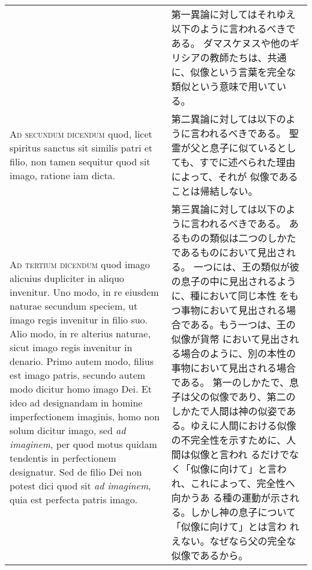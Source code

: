 \documentclass[10pt]{jsarticle} %
\begin{document}
\begin{longtable}{p{21em}p{21em}}
&

第一異論に対してはそれゆえ以下のように言われるべきである。
ダマスケヌスや他のギリシアの教師たちは、共通に、似像という言葉を完全な
 類似という意味で用いている。

\\



{\scshape Ad secundum dicendum} quod, licet spiritus sanctus sit similis patri et
filio, non tamen sequitur quod sit imago, ratione iam dicta.


&

第二異論に対しては以下のように言われるべきである。
聖霊が父と息子に似ているとしても、すでに述べられた理由によって、それが
 似像であることは帰結しない。

\\



{\scshape Ad tertium dicendum} quod imago alicuius dupliciter in aliquo
invenitur. Uno modo, in re eiusdem naturae secundum speciem, ut imago
regis invenitur in filio suo. Alio modo, in re alterius naturae, sicut
imago regis invenitur in denario. Primo autem modo, filius est imago
patris, secundo autem modo dicitur homo imago Dei. Et ideo ad
designandam in homine imperfectionem imaginis, homo non solum dicitur
imago, sed {\itshape ad imaginem}, per quod motus quidam tendentis in
perfectionem designatur. Sed de filio Dei non potest dici quod sit {\itshape ad
imaginem}, quia est perfecta patris imago.


&

第三異論に対しては以下のように言われるべきである。
あるものの類似は二つのしかたであるものにおいて見出される。
一つには、王の類似が彼の息子の中に見出されるように、種において同じ本性
 をもつ事物において見出される場合である。もう一つは、王の似像が貨幣
 において見出される場合のように、別の本性の事物において見出される場合
 である。
第一のしかたで、息子は父の似像であり、第二のしかたで人間は神の似姿であ
 る。ゆえに人間における似像の不完全性を示すために、人間は似像と言われ
 るだけでなく「似像に向けて」と言われ、これによって、完全性へ向かうあ
 る種の運動が示される。しかし神の息子について「似像に向けて」とは言わ
 れえない。なぜなら父の完全な似像であるから。


\end{longtable}
\newpage
\end{document}
